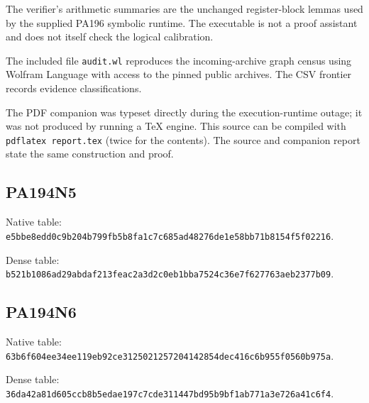 \documentclass[11pt,letterpaper]{article}
\begin{document}
The verifier's arithmetic summaries are the unchanged register-block
lemmas used by the supplied PA196 symbolic runtime. The executable is
not a proof assistant and does not itself check the logical calibration.

The included file \texttt{audit.wl} reproduces the incoming-archive
graph census using Wolfram Language with access to the pinned public
archives. The CSV frontier records evidence classifications.

The PDF companion was typeset directly during the execution-runtime
outage; it was not produced by running a TeX engine. This source can be
compiled with \texttt{pdflatex report.tex} (twice for the contents).
The source and companion report state the same construction and proof.
\subsection*{PA194N5}
Native table: \nolinkurl{e5bbe8edd0c9b204b799fb5b8fa1c7c685ad48276de1e58bb71b8154f5f02216}.

Dense table: \nolinkurl{b521b1086ad29abdaf213feac2a3d2c0eb1bba7524c36e7f627763aeb2377b09}.
\subsection*{PA194N6}
Native table: \nolinkurl{63b6f604ee34ee119eb92ce3125021257204142854dec416c6b955f0560b975a}.

Dense table: \nolinkurl{36da42a81d605ccb8b5edae197c7cde311447bd95b9bf1ab771a3e726a41c6f4}.
\end{document}
